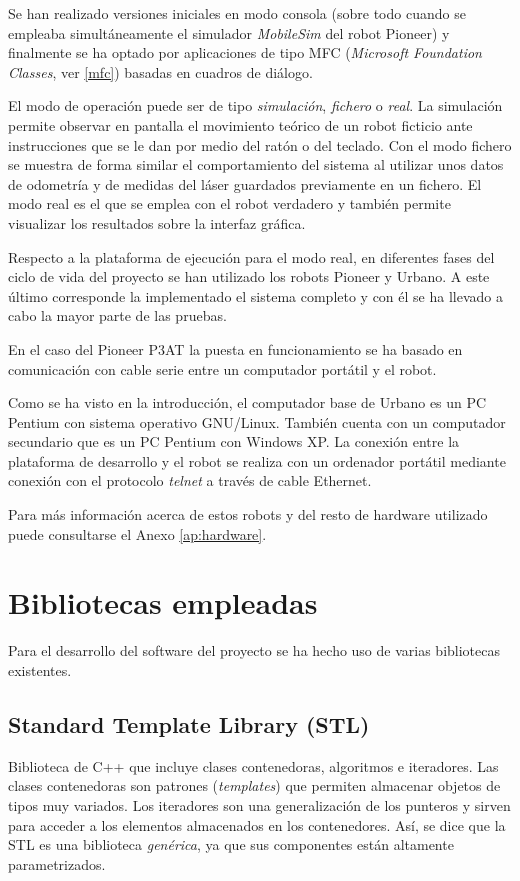 Se han realizado versiones iniciales en modo consola (sobre todo cuando se empleaba simultáneamente el simulador \emph{MobileSim} del robot Pioneer) y finalmente se ha optado por aplicaciones de tipo MFC (\emph{Microsoft Foundation Classes}, ver  \ref{mfc}) basadas en cuadros de diálogo.

El modo de operación puede ser de tipo \emph{simulación}, \emph{fichero} o \emph{real}. La simulación permite observar en pantalla el movimiento teórico de un robot ficticio ante instrucciones que se le dan por medio del ratón o del teclado. Con el modo fichero se muestra de forma similar el comportamiento del sistema al utilizar unos datos de odometría y de medidas del láser guardados previamente en un fichero. El modo real es el que se emplea con el robot verdadero y también permite visualizar los resultados sobre la interfaz gráfica.

Respecto a la plataforma de ejecución para el modo real, en diferentes fases del ciclo de vida del proyecto se han utilizado los robots Pioneer y Urbano. A este último corresponde la implementado el sistema completo y con él se ha llevado a cabo la mayor parte de las pruebas.

En el caso del Pioneer P3AT la puesta en funcionamiento se ha basado en comunicación con cable serie entre un computador portátil y el robot.

Como se ha visto en la introducción, el computador base de Urbano es un PC Pentium con sistema operativo GNU/Linux. También cuenta con un computador secundario que es un PC Pentium con Windows XP. La conexión entre la plataforma de desarrollo y el robot se realiza con un ordenador portátil mediante conexión con el protocolo \emph{telnet} a través de cable Ethernet.

Para más información acerca de estos robots y del resto de hardware utilizado puede consultarse el Anexo \ref{ap:hardware}.

\section{Bibliotecas empleadas}
Para el desarrollo del software del proyecto se ha hecho uso de varias bibliotecas existentes.

\subsection{Standard Template Library (STL)}

Biblioteca de C++ que incluye clases contenedoras, algoritmos e iteradores. Las clases contenedoras son patrones (\emph{templates}) que permiten almacenar objetos de tipos muy variados. Los iteradores son una generalización de los punteros y sirven para acceder a los elementos almacenados en los contenedores. Así, se dice que la STL es una biblioteca \emph{genérica}, ya que sus componentes están altamente parametrizados.

